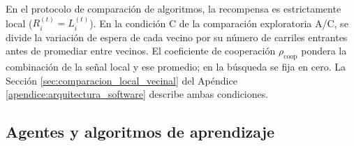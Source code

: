 En el protocolo de comparación de algoritmos, la recompensa es estrictamente local ($R_i^{(t)}=L_i^{(t)}$). En la condición C de la comparación exploratoria A/C, se divide la variación de espera de cada vecino por su número de carriles entrantes antes de promediar entre vecinos. El coeficiente de cooperación $\rho_{\mathrm{coop}}$ pondera la combinación de la señal local y ese promedio; en la búsqueda se fija en cero. La Sección \ref{sec:comparacion_local_vecinal} del Apéndice \ref{apendice:arquitectura_software} describe ambas condiciones.

\subsection{Agentes y algoritmos de aprendizaje}
\label{sec:implementacion_algoritmos}
\label{subsec:mecanismos_algoritmos}

